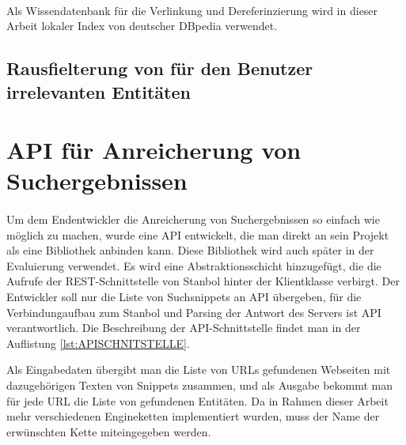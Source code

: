 \paragraph{}
Als Wissendatenbank für die Verlinkung und Dereferinzierung wird in dieser Arbeit lokaler Index von deutscher DBpedia verwendet.

\subsection{Rausfielterung von für den Benutzer irrelevanten Entitäten}

\section{API f{\"{u}}r Anreicherung von Suchergebnissen}
\paragraph{}
Um dem Endentwickler die Anreicherung von Suchergebnissen so einfach wie möglich zu machen, wurde eine API entwickelt, die man direkt an sein Projekt als eine Bibliothek anbinden kann. Diese Bibliothek wird auch später in der Evaluierung verwendet. Es wird eine Abstraktionsschicht hinzugefügt, die die Aufrufe der REST-Schnittstelle von Stanbol hinter der Klientklasse verbirgt. Der Entwickler soll nur die Liste von Suchsnippets an API übergeben, für die Verbindungaufbau zum Stanbol und Parsing der Antwort des Servers ist API verantwortlich. Die Beschreibung der API-Schnittstelle findet man in der Auflistung \ref{lst:APISCHNITSTELLE}. 

\lstset{language=Java}


Als Eingabedaten übergibt man die Liste von URLs gefundenen Webseiten mit dazugehörigen Texten von Snippets zusammen, und als Ausgabe bekommt man für jede URL die Liste von gefundenen Entitäten. Da in Rahmen dieser Arbeit mehr verschiedenen Engineketten implementiert wurden, muss der Name der erwünschten Kette miteingegeben werden.